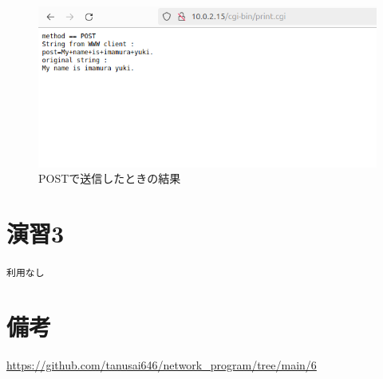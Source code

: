 \documentclass[documentclass]{jsarticle}
\begin{document}
\begin{figure}[H]
  \begin{center}
    \includegraphics*[scale=0.9]{figure/2-2.png}
  \end{center}
  \caption[]{POSTで送信したときの結果}
  \label{fig:2-3}
\end{figure}
\newpage

\section*{演習3}
\texttt{利用なし}

\section*{備考}
\url{https://github.com/tanusai646/network_program/tree/main/6}
\end{document}

